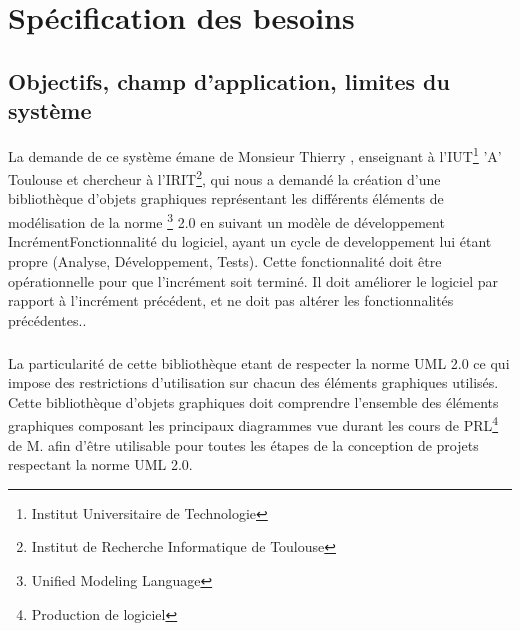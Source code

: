 \documentclass[12pt,a4paper,openany]{report}
\begin{document}
	\maketitle
	\newpage
	\tableofcontents
	
	\newpage
	\chapter{Spécification des besoins}
	\section{Objectifs, champ d'application, limites du système}
	La demande de ce système émane de Monsieur Thierry , enseignant à l'IUT\footnote{Institut Universitaire de Technologie}
	'A' Toulouse et chercheur à l'IRIT\footnote{Institut de Recherche Informatique de Toulouse},
	qui nous a demandé la création d'une bibliothèque d'objets graphiques représentant
	les différents éléments de modélisation de la norme 
	\footnote{Unified Modeling Language} 2.0 en suivant un modèle de développement 
	{Incrément}{Fonctionnalité du logiciel, ayant un cycle de developpement lui étant propre (Analyse, Développement, Tests).
	Cette fonctionnalité doit être opérationnelle pour que l'incrément soit terminé. Il doit améliorer le logiciel
	par rapport à l'incrément précédent, et ne doit pas altérer les fonctionnalités précédentes.}.
	\paragraph{}
	La particularité de cette bibliothèque etant de respecter la norme UML 2.0 ce qui impose des restrictions
	d'utilisation sur chacun des éléments graphiques utilisés.
	Cette bibliothèque d'objets graphiques doit comprendre l'ensemble des éléments graphiques composant
	les principaux diagrammes vue durant les cours de PRL\footnote{Production de logiciel} de M.  afin
	d'être utilisable pour toutes les étapes de la conception de projets respectant la norme UML 2.0.
	
\end{document}
